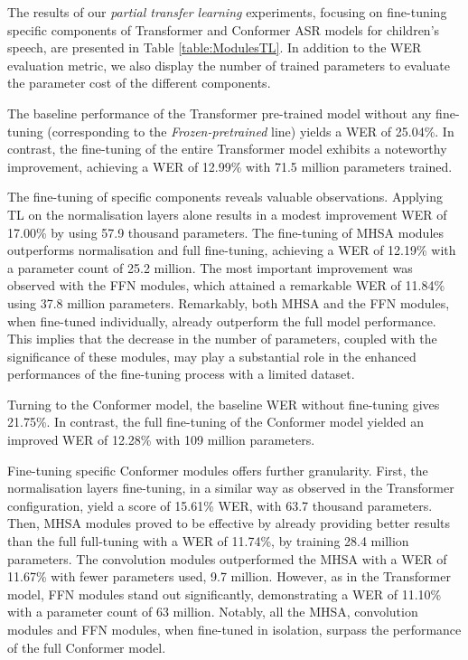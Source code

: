 The results of our \textit{partial transfer learning} experiments, focusing on fine-tuning specific components of Transformer and Conformer \ac{ASR} models for children's speech, are presented in Table \ref{table:ModulesTL}. In addition to the \ac{WER} evaluation metric, we also display the number of trained parameters to evaluate the parameter cost of the different components. 

The baseline performance of the Transformer pre-trained model without any fine-tuning (corresponding to the \textit{Frozen-pretrained} line) yields a \ac{WER} of 25.04\%. In contrast, the fine-tuning of the entire Transformer model exhibits a noteworthy improvement, achieving a \ac{WER} of 12.99\% with 71.5 million parameters trained.

The fine-tuning of specific components reveals valuable observations. Applying \ac{TL} on the normalisation layers alone results in a modest improvement \ac{WER} of 17.00\% by using 57.9 thousand parameters. The fine-tuning of \ac{MHSA} modules outperforms normalisation and full fine-tuning, achieving a \ac{WER} of 12.19\% with a parameter count of 25.2 million. The most important improvement was observed with the \ac{FFN} modules, which attained a remarkable \ac{WER} of 11.84\% using 37.8 million parameters. Remarkably, both \ac{MHSA} and the \ac{FFN} modules, when fine-tuned individually, already outperform the full model performance. This implies that the decrease in the number of parameters, coupled with the significance of these modules, may play a substantial role in the enhanced performances of the fine-tuning process with a limited dataset.

Turning to the Conformer model, the baseline \ac{WER} without fine-tuning gives 21.75\%. In contrast, the full fine-tuning of the Conformer model yielded an improved \ac{WER} of 12.28\% with 109 million parameters.

Fine-tuning specific Conformer modules offers further granularity. First, the normalisation layers fine-tuning, in a similar way as observed in the Transformer configuration, yield a score of 15.61\% WER, with 63.7 thousand parameters. Then, \ac{MHSA} modules proved to be effective by already providing better results than the full full-tuning with a \ac{WER} of 11.74\%, by training 28.4 million parameters. The convolution modules outperformed the \ac{MHSA} with a \ac{WER} of 11.67\% with fewer parameters used, 9.7 million. However, as in the Transformer model, \ac{FFN} modules stand out significantly, demonstrating a \ac{WER} of 11.10\% with a parameter count of 63 million. Notably, all the \ac{MHSA}, convolution modules and \ac{FFN} modules, when fine-tuned in isolation, surpass the performance of the full Conformer model.

